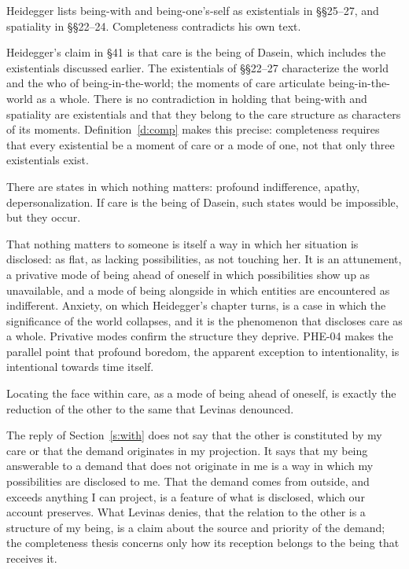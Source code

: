 \documentclass{situationist-preprint}
\begin{document}
\begin{objection}\label{o:list}
Heidegger lists being-with and being-one's-self as existentials in \S\S25--27, and spatiality in \S\S22--24. Completeness contradicts his own text.
\end{objection}

\begin{reply}
Heidegger's claim in \S41 is that care is the being of Dasein, which includes the existentials discussed earlier. The existentials of \S\S22--27 characterize the world and the who of being-in-the-world; the moments of care articulate being-in-the-world as a whole. There is no contradiction in holding that being-with and spatiality are existentials and that they belong to the care structure as characters of its moments. Definition~\ref{d:comp} makes this precise: completeness requires that every existential be a moment of care or a mode of one, not that only three existentials exist.
\end{reply}

\begin{objection}[Indifference]\label{o:indiff}
There are states in which nothing matters: profound indifference, apathy, depersonalization. If care is the being of Dasein, such states would be impossible, but they occur.
\end{objection}

\begin{reply}
That nothing matters to someone is itself a way in which her situation is disclosed: as flat, as lacking possibilities, as not touching her. It is an attunement, a privative mode of being ahead of oneself in which possibilities show up as unavailable, and a mode of being alongside in which entities are encountered as indifferent. Anxiety, on which Heidegger's chapter turns, is a case in which the significance of the world collapses, and it is the phenomenon that discloses care as a whole. Privative modes confirm the structure they deprive. PHE-04 makes the parallel point that profound boredom, the apparent exception to intentionality, is intentional towards time itself.
\end{reply}

\begin{objection}\label{o:levinas}
Locating the face within care, as a mode of being ahead of oneself, is exactly the reduction of the other to the same that Levinas denounced.
\end{objection}

\begin{reply}
The reply of Section~\ref{s:with} does not say that the other is constituted by my care or that the demand originates in my projection. It says that my being answerable to a demand that does not originate in me is a way in which my possibilities are disclosed to me. That the demand comes from outside, and exceeds anything I can project, is a feature of what is disclosed, which our account preserves. What Levinas denies, that the relation to the other is a structure of my being, is a claim about the source and priority of the demand; the completeness thesis concerns only how its reception belongs to the being that receives it.
\end{reply}
\end{document}
